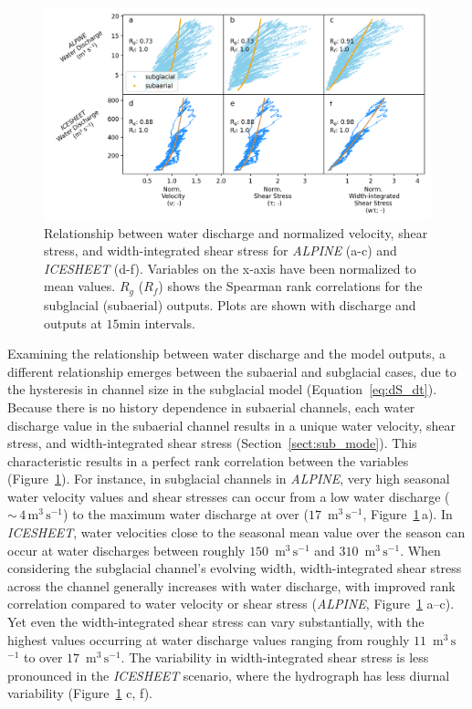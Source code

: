 \documentclass[draft]{agujournal2019}
\newcommand{\alpine}{\textit{ALPINE}}
\newcommand{\icesheet}{\textit{ICESHEET}}
\newcommand{\unit}[1]{$\mathrm{#1}$}
\begin{document}
\begin{figure}[h]
  \centering
  \includegraphics[width=0.9\linewidth]{Fig3.png}
  \caption{
    Relationship between water discharge and normalized velocity, shear stress, and width-integrated shear stress for \alpine{} (a-c) and \icesheet{} (d-f).
    Variables on the x-axis have been normalized to mean values.
    $R_g$ ($R_f$) shows the Spearman rank correlations for the subglacial (subaerial) outputs.
    Plots are shown with discharge and outputs at $15$\unit{min} intervals.
  }
  \label{fig:Qw_vari}
\end{figure}

Examining the relationship between water discharge and the model outputs, a different relationship emerges between the subaerial and subglacial cases, due to the hysteresis in channel size in the subglacial model (Equation~\ref{eq:dS_dt}).
Because there is no history dependence in  subaerial channels, each water discharge value in the subaerial channel results in a unique water velocity, shear stress, and width-integrated shear stress (Section~\ref{sect:sub_mode}).
This characteristic results in a perfect rank correlation between the variables (Figure~\ref{fig:Qw_vari}).
For instance, in subglacial channels in \alpine{}, very high seasonal water velocity values and shear stresses can occur from a low water discharge  ($\sim\,4$\,\unit{m}$^3$\,\unit{s}$^{-1}$) to the maximum water discharge at over ($17$ \,\unit{m}$^3$\,\unit{s}$^{-1}$, Figure~\ref{fig:Qw_vari}\,a).
In \icesheet{}, water velocities close to the seasonal mean value over the season can occur at water discharges between roughly $150$ \,\unit{m}$^3$\,\unit{s}$^{-1}$ and $310$ \,\unit{m}$^3$\,\unit{s}$^{-1}$.
When considering the subglacial channel's evolving width, width-integrated shear stress  across the channel generally increases with water discharge, with improved rank correlation compared to water velocity or shear stress (\alpine{}, Figure~\ref{fig:Qw_vari} a--c).
Yet even the width-integrated shear stress  can vary substantially, with the highest values occurring at water discharge values ranging from roughly $11$ \,\unit{m}$^3$\,\unit{s}$^{-1}$ to over $17$ \,\unit{m}$^3$\,\unit{s}$^{-1}$.
The variability in width-integrated shear stress is less pronounced in the \icesheet{} scenario, where the hydrograph has less diurnal variability (Figure~\ref{fig:Qw_vari} c, f).
\end{document}
